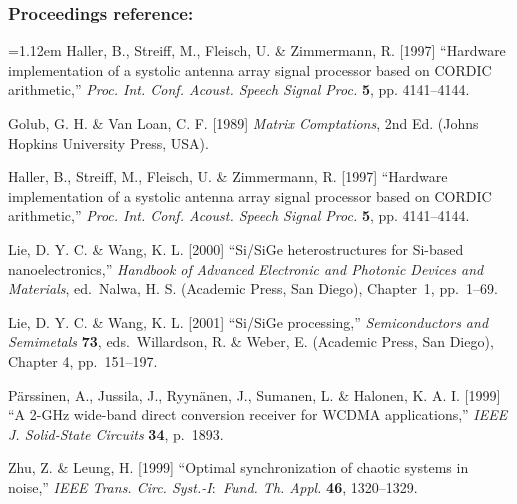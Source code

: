 \documentclass{ws-ijbc}
\begin{document}
\subsubsection*{Proceedings reference:}
\hangindent=1.12em Haller, B., Streiff, M., Fleisch, U. \&
Zimmermann, R. [1997] ``Hardware implementation of a systolic
\hbox{antenna} array signal processor based on CORDIC
arithmetic,'' {\it Proc. Int. Conf. Acoust. Speech
\hbox{Signal} Proc.} {\bf 5}, pp. 4141--4144.
\begin{thebibliography}{9}

 Golub, G. H. \& Van Loan, C. F. [1989] {\it Matrix
Comptations}, 2nd Ed. (Johns Hopkins University Press, USA).

 Haller, B., Streiff, M., Fleisch, U. \& Zimmermann,
R. [1997] ``Hardware implementation of a systolic \hbox{antenna}
array signal processor based on CORDIC arithmetic,'' {\it Proc.
Int. Conf. Acoust. Speech \hbox{Signal} Proc.} {\bf 5},
pp. 4141--4144.

 Lie, D. Y. C. \& Wang, K. L. [2000]  ``Si/SiGe
heterostructures for Si-based nanoelectronics,'' {\it Handbook of}
\hbox{\it Advanced} {\it Electronic and Photonic Devices and
Materials}, ed.~Nalwa, H. S. (\hbox{Academic}
Press, San Diego), Chapter~1, pp.~1--69.

 Lie, D. Y. C. \& Wang, K. L. [2001]
``Si/SiGe processing,''
{\it Semiconductors and Semimetals} {\bf 73}, eds.~Willardson, R.
\& Weber, E. (Academic Press, San Diego), Chapter 4, pp.~151--197.

 P\"arssinen, A., Jussila, J., Ryyn\"anen, J.,
Sumanen, L. \& Halonen, K.  A. I. [1999] ``A 2-GHz wide-band direct conversion receiver for WCDMA applications,'' {\it IEEE J. Solid-State
Circuits} {\bf 34}, p.~1893.

Zhu, Z. \& Leung, H. [1999] ``Optimal synchronization of chaotic systems in
noise,'' {\it IEEE Trans. Circ. Syst.-I\/$:$ Fund. Th. Appl.} {\bf 46},
1320--1329.

\end{thebibliography}
\end{document}
